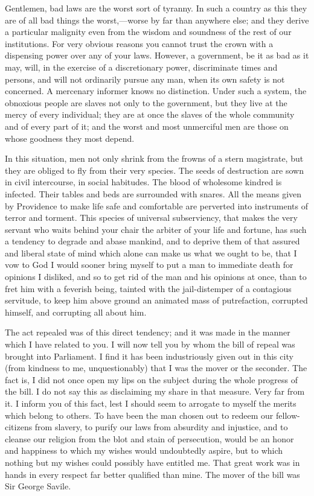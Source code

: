 Gentlemen, bad laws are the worst sort of tyranny. In such a country as this they are of all bad things the worst,—worse by far than anywhere else; and they derive a particular malignity even from the wisdom and soundness of the rest of our institutions. For very obvious reasons you cannot trust the crown with a dispensing power over any of your laws. However, a government, be it as bad as it may, will, in the exercise of a discretionary power, discriminate times and persons, and will not ordinarily pursue any man, when its own safety is not concerned. A mercenary informer knows no distinction. Under such a system, the obnoxious people are slaves not only to the government, but they live at the mercy of every individual; they are at once the slaves of the whole community and of every part of it; and the worst and most unmerciful men are those on whose goodness they most depend.

In this situation, men not only shrink from the frowns of a stern magistrate, but they are obliged to fly from their very species. The seeds of destruction are sown in civil intercourse, in social habitudes. The blood of wholesome kindred is infected. Their tables and beds are surrounded with snares. All the means given by Providence to make life safe and comfortable are perverted into instruments of terror and torment. This species of universal subserviency, that makes the very servant who waits behind your chair the arbiter of your life and fortune, has such a tendency to degrade and abase mankind, and to deprive them of that assured and liberal state of mind which alone can make us what we ought to be, that I vow to God I would sooner bring myself to put a man to immediate death for opinions I disliked, and so to get rid of the man and his opinions at once, than to fret him with a feverish being, tainted with the jail-distemper of a contagious servitude, to keep him above ground an animated mass of putrefaction, corrupted himself, and corrupting all about him.

The act repealed was of this direct tendency; and it was made in the manner which I have related to you. I will now tell you by whom the bill of repeal was brought into Parliament. I find it has been industriously given out in this city (from kindness to me, unquestionably) that I was the mover or the seconder. The fact is, I did not once open my lips on the subject during the whole progress of the bill. I do not say this as disclaiming my share in that measure. Very far from it. I inform you of this fact, lest I should seem to arrogate to myself the merits which belong to others. To have been the man chosen out to redeem our fellow-citizens from slavery, to purify our laws from absurdity and injustice, and to cleanse our religion from the blot and stain of persecution, would be an honor and happiness to which my wishes would undoubtedly aspire, but to which nothing but my wishes could possibly have entitled me. That great work was in hands in every respect far better qualified than mine. The mover of the bill was Sir George Savile.

